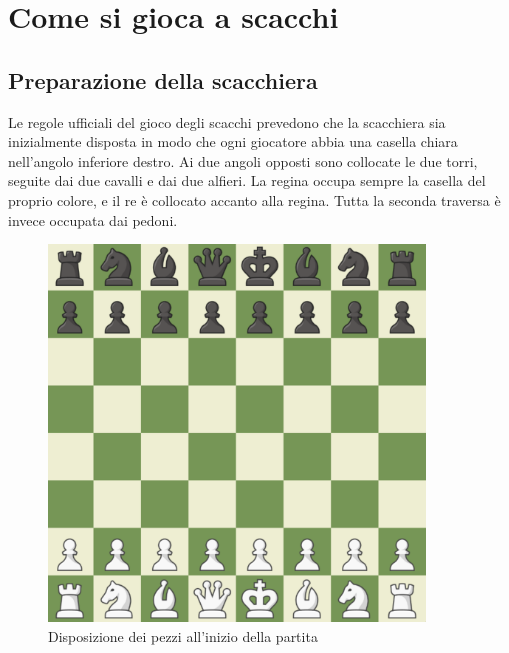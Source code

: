 \section{Come si gioca a scacchi}
\subsection{Preparazione della scacchiera}
Le regole ufficiali del gioco degli scacchi\cite{lawsofchess} prevedono che la scacchiera sia inizialmente disposta in modo che ogni giocatore abbia una casella chiara nell'angolo inferiore destro. Ai due angoli opposti sono collocate le due torri, seguite dai due cavalli e dai due alfieri. La regina occupa sempre la casella del proprio colore, e il re è collocato accanto alla regina. Tutta la seconda traversa è invece occupata dai pedoni.
\begin{figure}[!htb]
    \includegraphics[width=10cm]{frontmatter/figure/scacchiera_iniziale.pdf}
    \centering
    \caption{Disposizione dei pezzi all'inizio della partita}
    \label{fig:checkmate}
\end{figure}
